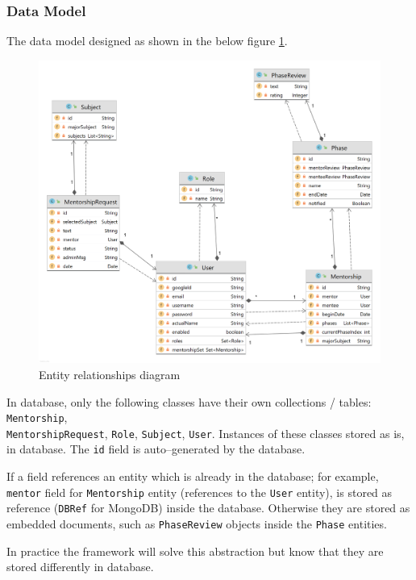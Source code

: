 \documentclass[10pt]{article}
\begin{document}
\subsubsection{Data Model} \label{data_models}
The data model designed as shown in the below figure \ref{fig:domains}.

\begin{figure}[ht!]
    \centering
    \includegraphics[width=\textwidth]{diagram-domains.png}
    \caption{Entity relationships diagram}
    \label{fig:domains}
\end{figure}

In database, only the following classes have their own collections / tables:
\texttt{Mentorship},\\ \texttt{MentorshipRequest}, \texttt{Role}, \texttt{Subject}, 
\texttt{User}. Instances of these classes stored as is, in database. The \texttt{id} 
field is auto--generated by the database.

If a field references an entity which is already in the database; for example,
\texttt{mentor} field for \texttt{Mentorship} entity (references to the \texttt{User}
entity), is stored as reference (\texttt{DBRef} for MongoDB) inside the database. 
Otherwise they are stored as embedded documents, such as \texttt{PhaseReview} objects
inside the \texttt{Phase} entities.

In practice the framework will solve this abstraction but know that they are stored
differently in database.
\newpage
\end{document}
